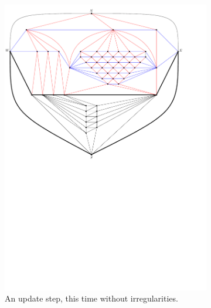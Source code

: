 \begin{figure}
    \ContinuedFloat
    \begin{subfigure}[b]{.9 \textwidth}
      \includegraphics[width=\textwidth]{examples/img/vertWorstCase/sweep5}
      \caption{An update step, this time without irregularities.}
      \label{fig:ex:vert:sweep5}
    \end{subfigure}
    ~
    \begin{subfigure}[b]{.9 \textwidth}

\end{subfigure}
\end{figure}
